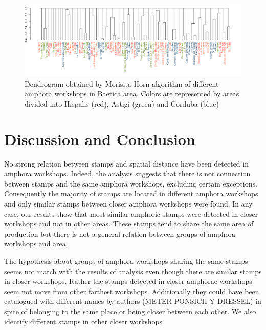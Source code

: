 \documentclass[review]{elsarticle}
\begin{document}
\begin{figure}[htp]
	\centering
\includegraphics[width=\linewidth]{figs/dendro}
\caption{Dendrogram obtained by Morisita-Horn algorithm of different amphora workshops in Baetica area. Colors are represented by areas divided into Hispalis (red), Astigi (green) and Corduba (blue)}
\label{dendro}
\end{figure} 





\section{Discussion and Conclusion}

No strong relation between stamps and spatial distance have been detected in amphora workshops. Indeed, the analysis suggests that there is not connection between stamps and the same amphora workshops, excluding certain exceptions. Consequently the majority of stamps are located in different amphora workshops and only similar stamps between closer amphora workshops were found. In any case, our results show that most similar amphoric stamps were detected in closer workshops and not in other areas. These stamps tend to share the same area of production but there is not a general relation between groups of amphora workshops and area. 

The hypothesis about groups of amphora workshops sharing the same stamps seems not match with the results of analysis even though there are similar stamps in closer workshops. Rather the stamps detected in closer amphorae workshops seem not move from other farthest workshops. Additionally they could have been catalogued with different names by authors (METER PONSICH Y DRESSEL) in spite of belonging to the same place or being closer between each other. We also identify different stamps in other closer workshops. 
\end{document}
